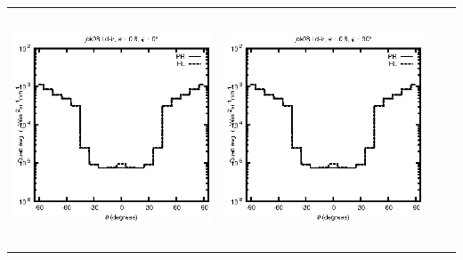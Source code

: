 \documentclass[10pt,a4paper]{article}
\begin{document}
\begin{adjustwidth}{-1.2in}{-1.2in}
\begin{tabular}{c c c c}
\includegraphics[height=7cm]{../eps/jok08_Ld_ir_fwd.eps} &
\includegraphics[height=7cm]{../eps/jok08_Ld_ir_cross.eps} \\
\end{tabular}

\pagebreak


\end{adjustwidth}
\end{document}
